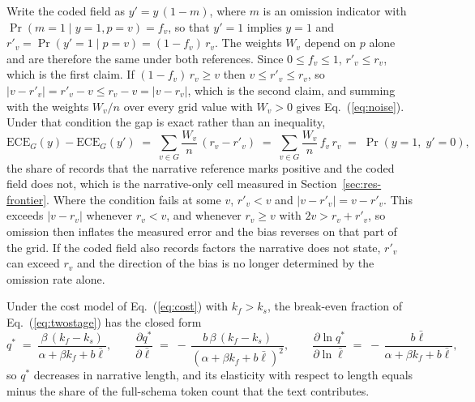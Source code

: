 \begin{prooflem}
Write the coded field as $y' = y\,(1 - m)$, where $m$ is an omission indicator with
$\Pr(m = 1 \mid y = 1, p = v) = f_v$, so that $y' = 1$ implies $y = 1$ and
$r'_v = \Pr(y' = 1 \mid p = v) = (1 - f_v)\, r_v$. The weights $W_v$ depend on $p$ alone and are
therefore the same under both references. Since $0 \le f_v \le 1$, $r'_v \le r_v$, which is
the first claim. If $(1 - f_v)\, r_v \ge v$ then $v \le r'_v \le r_v$, so
$|v - r'_v| = r'_v - v \le r_v - v = |v - r_v|$, which is the second claim, and summing with the
weights $W_v/n$ over every grid value with $W_v > 0$ gives Eq.~(\ref{eq:noise}). Under that
condition the gap is exact rather than an inequality,
\begin{equation}
\mathrm{ECE}_G(y) - \mathrm{ECE}_G(y') \;=\; \sum_{v \in G} \frac{W_v}{n}\,(r_v - r'_v)
\;=\; \sum_{v \in G} \frac{W_v}{n}\, f_v\, r_v \;=\; \Pr(y = 1,\; y' = 0),
\label{eq:app-gap}
\end{equation}
the share of records that the narrative reference marks positive and the coded field does
not, which is the narrative-only cell measured in Section~\ref{sec:res-frontier}. Where the
condition fails at some $v$, $r'_v < v$ and $|v - r'_v| = v - r'_v$. This exceeds $|v - r_v|$
whenever $r_v < v$, and whenever $r_v \ge v$ with $2v > r_v + r'_v$, so omission then inflates
the measured error and the bias reverses on that part of the grid. If the coded field also
records factors the narrative does not state, $r'_v$ can exceed $r_v$ and the direction of the
bias is no longer determined by the omission rate alone.
\end{prooflem}

\begin{lemma}
\label{lem:breakeven}
Under the cost model of Eq.~(\ref{eq:cost}) with $k_f > k_s$, the break-even fraction of
Eq.~(\ref{eq:twostage}) has the closed form
\begin{equation}
q^{*} \;=\; \frac{\beta\,(k_f - k_s)}{\alpha + \beta k_f + b\bar{\ell}},\qquad
\frac{\partial q^{*}}{\partial \bar{\ell}} \;=\; -\,\frac{b\,\beta\,(k_f - k_s)}{(\alpha + \beta k_f + b\bar{\ell})^2},\qquad
\frac{\partial \ln q^{*}}{\partial \ln \bar{\ell}} \;=\; -\,\frac{b\bar{\ell}}{\alpha + \beta k_f + b\bar{\ell}},
\label{eq:app-breakeven}
\end{equation}
so $q^{*}$ decreases in narrative length, and its elasticity with respect to length equals
minus the share of the full-schema token count that the text contributes.
\end{lemma}

